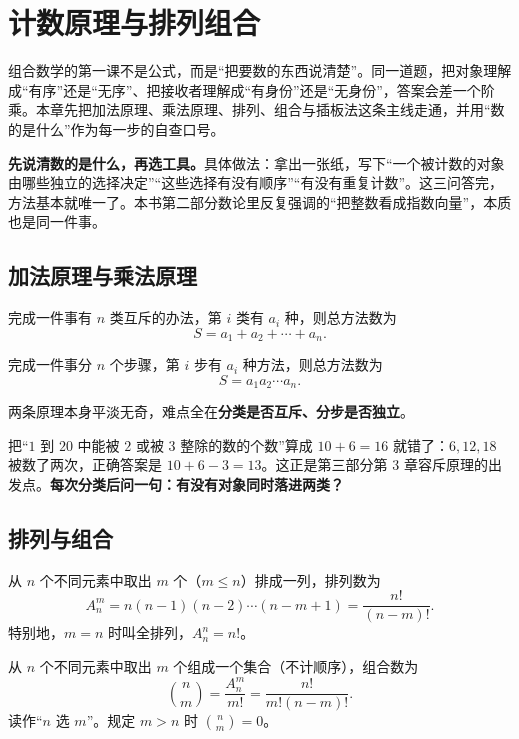 
\chapter{计数原理与排列组合}
\begin{chapterintro}[章节导读]
组合数学的第一课不是公式，而是“把要数的东西说清楚”。同一道题，把对象理解成“有序”还是“无序”、把接收者理解成“有身份”还是“无身份”，答案会差一个阶乘。本章先把加法原理、乘法原理、排列、组合与插板法这条主线走通，并用“数的是什么”作为每一步的自查口号。
\end{chapterintro}

\begin{tip}[组合数学的总口诀]
\textbf{先说清数的是什么，再选工具。}具体做法：拿出一张纸，写下“一个被计数的对象由哪些独立的选择决定”“这些选择有没有顺序”“有没有重复计数”。这三问答完，方法基本就唯一了。本书第二部分数论里反复强调的“把整数看成指数向量”，本质也是同一件事。
\end{tip}

\section{加法原理与乘法原理}
\begin{theorem}[加法原理]
完成一件事有 $n$ 类互斥的办法，第 $i$ 类有 $a_i$ 种，则总方法数为
\[
S=a_1+a_2+\cdots+a_n.
\]
\end{theorem}
\begin{theorem}[乘法原理]
完成一件事分 $n$ 个步骤，第 $i$ 步有 $a_i$ 种方法，则总方法数为
\[
S=a_1a_2\cdots a_n.
\]
\end{theorem}
两条原理本身平淡无奇，难点全在\textbf{分类是否互斥、分步是否独立}。

\begin{pitfall}[分类不互斥]
把“$1$ 到 $20$ 中能被 $2$ 或被 $3$ 整除的数的个数”算成 $10+6=16$ 就错了：$6,12,18$ 被数了两次，正确答案是 $10+6-3=13$。这正是第三部分第 3 章容斥原理的出发点。\textbf{每次分类后问一句：有没有对象同时落进两类？}
\end{pitfall}

\section{排列与组合}
\begin{definition}[排列数]
从 $n$ 个不同元素中取出 $m$ 个（$m\le n$）排成一列，排列数为
\[
A_n^m=n(n-1)(n-2)\cdots(n-m+1)=\frac{n!}{(n-m)!}.
\]
特别地，$m=n$ 时叫全排列，$A_n^n=n!$。
\end{definition}
\begin{definition}[组合数]
从 $n$ 个不同元素中取出 $m$ 个组成一个集合（不计顺序），组合数为
\[
\binom nm=\frac{A_n^m}{m!}=\frac{n!}{m!(n-m)!}.
\]
读作“$n$ 选 $m$”。规定 $m>n$ 时 $\binom nm=0$。
\end{definition}


